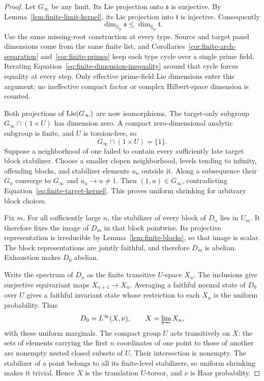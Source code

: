 \begin{proof}
Let $G_\infty$ be any limit.  Its Lie projection onto
$\mathfrak s$ is surjective.  By
Lemma~\ref{lem:finite-limit-kernel}, its Lie projection into
$\mathfrak t$ is injective.  Consequently
\begin{equation}
 \dim_{\mathbb Q_p}\mathfrak s
 \leq\dim_{\mathbb Q_p}\mathfrak t.
 \label{eq:finite-dimension-inequality}
\end{equation}
Use the same missing-root construction at every type.
Source and target panel dimensions come from the same finite list,
and Corollaries~\ref{cor:finite-arch-separation}
and~\ref{cor:finite-primes} keep each type cycle over a single
prime field.  Iterating
Equation~\eqref{eq:finite-dimension-inequality} around that cycle
forces equality at every step.  Only effective prime-field Lie
dimensions enter this argument; no ineffective compact factor or
complex Hilbert-space dimension is counted.

Both projections of $\operatorname{Lie}(G_\infty)$ are now isomorphisms.
The target-only subgroup $G_\infty\cap(1\times U)$ has dimension
zero.  A compact zero-dimensional analytic subgroup is finite,
and $U$ is torsion-free, so
\begin{equation}
 G_\infty\cap(1\times U)=\{1\}.
 \label{eq:finite-target-kernel}
\end{equation}
Suppose a neighborhood of one failed to contain every sufficiently
late target block stabilizer.  Choose a smaller clopen neighborhood,
levels tending to infinity, offending blocks, and stabilizer
elements $u_n$ outside it.  Along a subsequence their $G_n$ converge
to $G_\infty$ and $u_n\to u\ne1$.
Then $(1,u)\in G_\infty$, contradicting
Equation~\eqref{eq:finite-target-kernel}.
This proves uniform shrinking for arbitrary block choices.

Fix $m$.  For all sufficiently large $n$, the stabilizer of every
block of $D_n$ lies in $U_m$.  It therefore fixes the image of
$D_m$ in that block pointwise.  Its projective representation is
irreducible by Lemma~\ref{lem:finite-blocks}, so that image is
scalar.  The block representations are jointly faithful, and
therefore $D_m$ is abelian.  Exhaustion makes $D_0$ abelian.

Write the spectrum of $D_n$ as the finite transitive $U$-space
$X_n$.  The inclusions give surjective equivariant maps
$X_{n+1}\to X_n$.  Averaging a faithful normal state of $D_0$
over $U$ gives a faithful invariant state whose restriction to
each $X_n$ is the uniform probability.  Thus
\[
 D_0=L^\infty(X,\nu),\qquad X=\varprojlim X_n,
\]
with these uniform marginals.  The compact group $U$ acts
transitively on $X$: the sets of elements carrying the first $n$
coordinates of one point to those of another are nonempty nested
closed subsets of $U$.  Their intersection is nonempty.
The stabilizer of a point belongs to all its finite-level
stabilizers, so uniform shrinking makes it trivial.  Hence $X$
is the translation $U$-torsor, and $\nu$ is Haar probability.
\end{proof}

